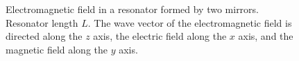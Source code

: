 \begin{figure}
\centering



\caption{Electromagnetic field in a resonator formed by two mirrors. Resonator length $L$. The wave vector of the electromagnetic field is directed along the $z$ axis, the electric field along the $x$ axis, and the magnetic field along the $y$ axis.}
\label{figCh1_Res}
\end{figure}